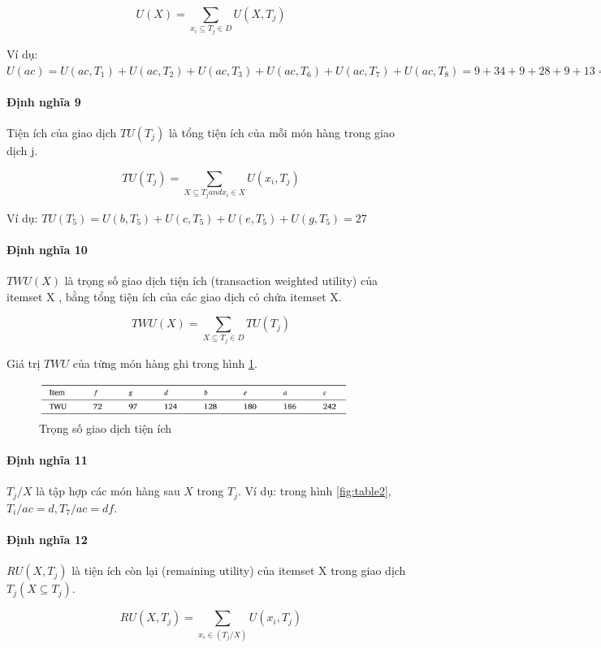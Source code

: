 $$ U(X) = \sum_{x_i \subseteq T_j \in D} U(X, T_j) $$

Ví dụ: $U(ac) = U(ac, T_1) + U(ac, T_2) + U(ac, T_3) + U(ac, T_6) + U(ac, T_7) + U(ac, T_8) = 9 + 34 + 9 + 28 + 9 + 13 = 101 $

\paragraph{Định nghĩa 9} Tiện ích của giao dịch $TU(T_j)$ là tổng tiện ích của mỗi món hàng trong giao dịch j.

$$ TU(T_j) = \sum_{X \subseteq T_j and x_i \in X} U(x_i, T_j) $$

Ví dụ: $TU(T_5) = U(b, T_5) + U(c, T_5) + U(e, T_5) + U(g, T_5) = 27$

\paragraph{Định nghĩa 10}  $TWU(X)$ là trọng số giao dịch tiện ích (transaction weighted utility) của itemset X , bằng tổng tiện ích của các giao dịch có chứa itemset X.

$$ TWU(X) = \sum_{X \subseteq T_j \in D} TU(T_j) $$

Giá trị $TWU$ của từng món hàng ghi trong hình \ref{fig:table4}.



\begin{figure}[h]
\centering
\includegraphics[width=0.9\textwidth]{image/table/table4.PNG}
\caption{\label{fig:table4} Trọng số giao dịch tiện ích  }
\end{figure}

\paragraph{Định nghĩa 11} $T_j/X$ là tập hợp các món hàng sau $X$ trong $T_j$. Ví dụ: trong hình \ref{fig:table2}, $T_i/ac = d, T_7/ac = df$.

\paragraph{Định nghĩa 12} $RU(X, T_j)$  là tiện ích còn lại (remaining utility) của itemset X trong giao dịch $T_j(X \subseteq T_j)$.

$$ RU(X, T_j) = \sum_{x_i \in (T_j/X)} U(x_i, T_j) $$

